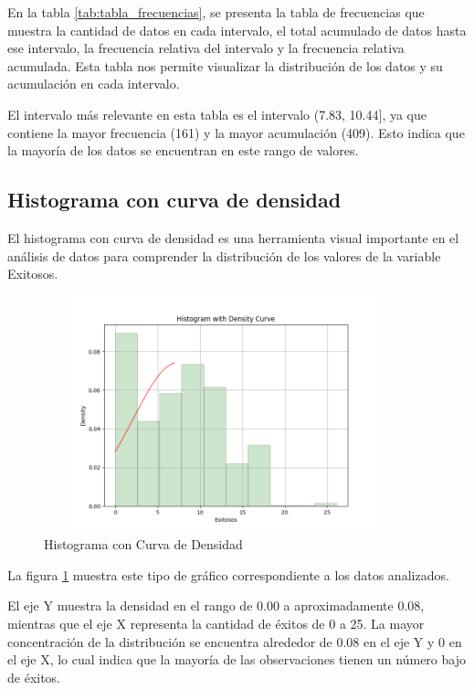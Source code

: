 En la tabla \ref{tab:tabla_frecuencias}, se presenta la tabla de frecuencias que
muestra la cantidad de datos en cada intervalo, el total acumulado de datos hasta ese
intervalo, la frecuencia relativa del intervalo y la frecuencia relativa acumulada.
Esta tabla nos permite visualizar la distribución de los datos y su acumulación en cada
intervalo.

El intervalo más relevante en esta tabla es el intervalo (7.83, 10.44], ya que contiene
la mayor frecuencia (161) y la mayor acumulación (409). Esto indica que la mayoría de
los datos se encuentran en este rango de valores.

\subsection{Histograma con curva de densidad}

El histograma con curva de densidad es una herramienta visual importante en el análisis de datos
para comprender la distribución de los valores de la variable Exitosos.

\begin{figure}[ht]
    \centering
    \includegraphics[width=4.06111in,height=2.68611in]{img/histogramaConCurvaDeDensidad.png}
    \caption{Histograma con Curva de Densidad}
    \label{fig:hist_density}
\end{figure}

La figura \ref{fig:hist_density} muestra este tipo de gráfico correspondiente a los datos analizados.

El eje Y muestra la densidad en el rango de 0.00 a aproximadamente 0.08, mientras que el eje X
representa la cantidad de éxitos de 0 a 25. La mayor concentración de la distribución se
encuentra alrededor de 0.08 en el eje Y y 0 en el eje X, lo cual indica que la mayoría de
las observaciones tienen un número bajo de éxitos.


